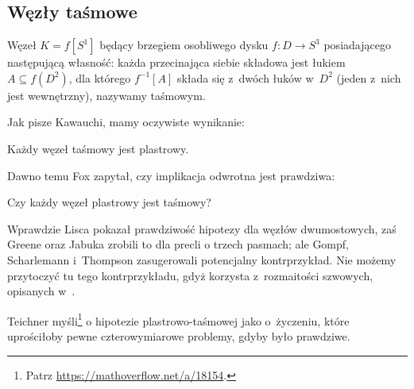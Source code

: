 
\subsection{Węzły taśmowe}
%
\begin{definition}
    Węzeł $K = f[S^1]$ będący brzegiem osobliwego dysku $f \colon D \to S^3$ posiadającego następującą własność: każda przecinająca siebie składowa jest łukiem $A \subseteq f(D^2)$, dla którego $f^{-1}[A]$ składa się z~dwóch łuków w~$D^2$ (jeden z~nich jest wewnętrzny), nazywamy taśmowym.
\end{definition}

Jak pisze Kawauchi, mamy oczywiste wynikanie:

\begin{proposition}
%
    Każdy węzeł taśmowy jest plastrowy.
\end{proposition}

Dawno temu Fox \cite[problem 1.33]{kirby78} zapytał, czy implikacja odwrotna jest prawdziwa:
%

\begin{conjecture}
    Czy każdy węzeł plastrowy jest taśmowy?
\end{conjecture}

Wprawdzie Lisca \cite{lisca07} pokazał prawdziwość hipotezy dla węzłów dwumostowych,
%
%
zaś Greene oraz Jabuka \cite{greene11} zrobili to dla precli o trzech pasmach;
%
%
%
ale Gompf, Scharlemann i~Thompson \cite{gompf10} zasugerowali potencjalny kontrprzykład.
%
%
%
%
Nie możemy przytoczyć tu tego kontrprzykładu, gdyż korzysta z~rozmaitości szwowych, opisanych w~\cite[s. 53-59]{kawauchi96}.

Teichner myśli\footnote{Patrz \url{https://mathoverflow.net/a/18154}.} o hipotezie plastrowo-taśmowej jako o~życzeniu, które uprościłoby pewne czterowymiarowe problemy, gdyby było prawdziwe.
%



